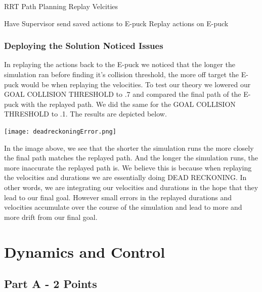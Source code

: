 \documentclass{article}
\numberwithin{equation}{section} %
\numberwithin{figure}{section} %
\numberwithin{table}{section} %
\begin{document}
\begin{framed}
\begin{algorithm}[H]
\caption{RRT Path Planning Replay Velcities }\label{alg:cap}
\begin{algorithmic}[1] %
\State Have Supervisor send saved actions to E-puck
\EndIf
{}
\State Replay actions on E-puck
\EndIf
\end{algorithmic}
\end{algorithm}

\subsubsection{Deploying the Solution Noticed Issues}
In replaying the actions back to the E-puck we noticed that the longer the simulation ran before finding it's collision threshold, the more off target the E-puck would be when replaying the velocities. To test our theory we lowered our GOAL COLLISION THRESHOLD to .7 and compared the final path of the E-puck with the replayed path.  We did the same for the GOAL COLLISION THRESHOLD to .1.  The results are depicted below.

\begin{center}
\texttt{[image: deadreckoningError.png]}
\end{center}

In the image above, we see that the shorter the simulation runs the more closely the final path matches the replayed path.  And the longer the simulation runs, the more inaccurate the replayed path is.  We believe this is because when replaying the velocities and durations we are essentially doing DEAD RECKONING.  In other words, we are integrating our velocities and durations in the hope that they lead to our final goal.  However small errors in the replayed durations and velocities accumulate over the course of the simulation and lead to more and more drift from our final goal. 

\end{framed}

\section{Dynamics and Control}

\begin{framed}
\subsection{ Part A - 2 Points}
\label{sec:DynAndCtrl}
\end{framed}
\end{document}
